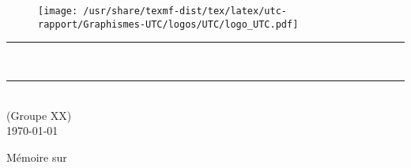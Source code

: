 \thispagestyle{empty} %
\setcounter{page}{0} %

\begin{figure}[H]
\centering
\texttt{[image: /usr/share/texmf-dist/tex/latex/utc-rapport/Graphismes-UTC/logos/UTC/logo\_UTC.pdf]}
\end{figure}

\vspace{3cm}

\begin{center}

{\color{jauneUTC}\rule{\linewidth}{0.8mm}}
\vspace*{0mm}

\Huge{\textbf{\theUV \\ \thetitle}}
{\color{jauneUTC}\rule{\linewidth}{0.8mm}}

\vspace{0.5cm}
\Large{\theauthor} \\
\small{(Groupe XX)}\\
\Large{\today}
\end{center}
 
\vspace{3cm}

\begin{myabstract}
Mémoire sur 
\end{myabstract}

\clearpage
